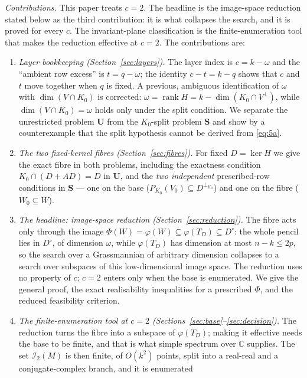 \documentclass[journal]{IEEEtran}
\theoremstyle{plainn}
\theoremstyle{remark}
\newcommand{\rank}{\operatorname{rank}}
\begin{document}
\emph{Contributions.} This paper treats $c=2$. The headline is the image-space reduction stated below as
the third contribution: it is what collapses the search, and it is proved for every $c$. The
invariant-plane classification is the finite-enumeration tool that makes the reduction effective at
$c=2$. The contributions are:
\begin{enumerate}[label=\arabic*.,leftmargin=*,itemsep=1pt,topsep=2pt]
\item \emph{Layer bookkeeping (Section~\ref{sec:layers}).} The layer index is $c=k-\omega$ and the
``ambient row excess'' is $t=q-\omega$; the identity $c-t=k-q$ shows that $c$ and $t$ move together when
$q$ is fixed. A previous, ambiguous identification of $\omega$ with $\dim(V\cap K_0)$ is corrected:
$\omega=\rank H=k-\dim(K_0\cap V^\perp)$, while $\dim(V\cap K_0)=\omega$ holds only under the split
condition. We
separate the unrestricted problem \textbf{U} from the $K_0$-split problem \textbf{S} and show by a
counterexample that the split hypothesis cannot be derived from \eqref{eq:5a}.
\item \emph{The two fixed-kernel fibres (Section~\ref{sec:fibres}).} For fixed $D=\ker H$ we give the
exact fibre in both problems, including the exactness condition $K_0\cap(D+AD)=D$ in \textbf{U}, and the
\emph{two independent} prescribed-row conditions in \textbf{S} --- one on the base
($P_{K_0}(V_0)\subseteq D^{\perp_{K_0}}$) and one on the fibre ($W_0\subseteq W$).
\item \emph{The headline: image-space reduction (Section~\ref{sec:reduction}).} The fibre acts only
through the image $\Phi(W)=\varphi(W)\subseteq\varphi(T_D)\subseteq D^\circ$: the whole pencil lies in
$D^\circ$, of dimension $\omega$, while $\varphi(T_D)$ has dimension at most $n-k\le 2p$, so the search
over a Grassmannian of arbitrary dimension collapses to a search over subspaces of this low-dimensional
image space. The reduction uses no property of $c$; $c=2$ enters only when the base is enumerated. We give
the general proof, the exact realisability inequalities for a prescribed $\Phi$, and the reduced
feasibility criterion.
\item \emph{The finite-enumeration tool at $c=2$ (Sections~\ref{sec:base}--\ref{sec:decision}).} The
reduction turns the fibre into a subspace of $\varphi(T_D)$; making it effective needs the base to be
finite, and that is what simple spectrum over $\mathbb C$ supplies. The set $\mathcal I_2(M)$ is then
finite, of $O(k^2)$ points, split into a real-real and a conjugate-complex branch, and it is enumerated

\end{enumerate}
\end{document}
